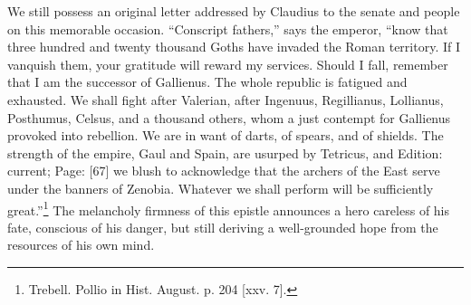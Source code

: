 We still possess an original letter addressed by Claudius to the senate and people on this memorable occasion. \texthebrew{“}Conscript fathers,\texthebrew{}” says the emperor, \texthebrew{“}know that three hundred and twenty thousand Goths have invaded the Roman territory. If I vanquish them, your gratitude will reward my services. Should I fall, remember that I am the successor of Gallienus. The whole republic is fatigued and exhausted. We shall fight after Valerian, after Ingenuus, Regillianus, Lollianus, Posthumus, Celsus, and a thousand others, whom a just contempt for Gallienus provoked into rebellion. We are in want of darts, of spears, and of shields. The strength of the empire, Gaul and Spain, are usurped by Tetricus, and Edition: current; Page: [67] we blush to acknowledge that the archers of the East serve under the banners of Zenobia. Whatever we shall perform will be sufficiently great.\texthebrew{}”\footnote{Trebell. Pollio in Hist. August. p. 204 [xxv. 7].} The melancholy firmness of this epistle announces a hero careless of his fate, conscious of his danger, but still deriving a well-grounded hope from the resources of his own mind.

